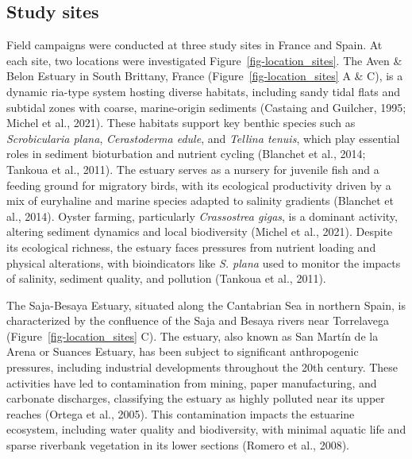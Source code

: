 \documentclass[
  letterpaper,
  DIV=11,
  numbers=noendperiod]{scrartcl}
\begin{document}
\subsection{Study sites}\label{study-sites}

Field campaigns were conducted at three study sites in France and Spain.
At each site, two locations were investigated
Figure~\ref{fig-location_sites}. The Aven \& Belon Estuary in South
Brittany, France (Figure~\ref{fig-location_sites} A \& C), is a dynamic
ria-type system hosting diverse habitats, including sandy tidal flats
and subtidal zones with coarse, marine-origin sediments (Castaing and
Guilcher, 1995; Michel et al., 2021). These habitats support key benthic
species such as \emph{Scrobicularia plana}, \emph{Cerastoderma edule},
and \emph{Tellina tenuis}, which play essential roles in sediment
bioturbation and nutrient cycling (Blanchet et al., 2014; Tankoua et
al., 2011). The estuary serves as a nursery for juvenile fish and a
feeding ground for migratory birds, with its ecological productivity
driven by a mix of euryhaline and marine species adapted to salinity
gradients (Blanchet et al., 2014). Oyster farming, particularly
\emph{Crassostrea gigas}, is a dominant activity, altering sediment
dynamics and local biodiversity (Michel et al., 2021). Despite its
ecological richness, the estuary faces pressures from nutrient loading
and physical alterations, with bioindicators like \emph{S. plana} used
to monitor the impacts of salinity, sediment quality, and pollution
(Tankoua et al., 2011).

The Saja-Besaya Estuary, situated along the Cantabrian Sea in northern
Spain, is characterized by the confluence of the Saja and Besaya rivers
near Torrelavega (Figure~\ref{fig-location_sites} C). The estuary, also
known as San Martín de la Arena or Suances Estuary, has been subject to
significant anthropogenic pressures, including industrial developments
throughout the 20th century. These activities have led to contamination
from mining, paper manufacturing, and carbonate discharges, classifying
the estuary as highly polluted near its upper reaches (Ortega et al.,
2005). This contamination impacts the estuarine ecosystem, including
water quality and biodiversity, with minimal aquatic life and sparse
riverbank vegetation in its lower sections (Romero et al., 2008).
\end{document}
